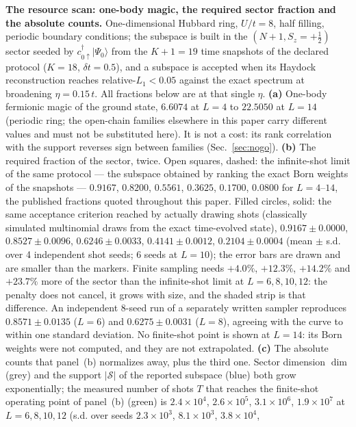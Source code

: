 \caption{\textbf{The resource scan: one-body magic, the required sector fraction and the absolute counts.}
One-dimensional Hubbard ring, $U/t=8$, half filling, periodic boundary conditions; the subspace is
built in the $(N{+}1,S_z{=}{+}\tfrac12)$ sector seeded by $c^{\dagger}_{0\uparrow}\lvert\Psi_0\rangle$ from the
$K{+}1=19$ time snapshots of the declared protocol ($K=18$, $\delta t=0.5$), and a subspace is
accepted when its Haydock reconstruction reaches relative-$L_1<0.05$ against the exact spectrum at
broadening $\eta=0.15\,t$. All fractions below are at that single $\eta$.
\textbf{(a)} One-body fermionic magic of the ground state, $6.6074$ at $L=4$ to $22.5050$ at $L=14$
(periodic ring; the open-chain families elsewhere in this paper carry different values
and must not be substituted here). It is not a cost: its rank correlation with the support reverses
sign between families (Sec.~\ref{sec:nogo}).
\textbf{(b)} The required fraction of the sector, twice. Open squares, dashed: the infinite-shot
limit of the same protocol --- the subspace obtained by ranking the exact Born weights of the
snapshots --- $0.9167$, $0.8200$, $0.5561$, $0.3625$, $0.1700$, $0.0800$ for $L=4$--$14$, the published fractions quoted throughout this paper. Filled circles, solid: the same acceptance criterion reached by
actually drawing shots (classically simulated multinomial draws from the exact time-evolved state), $0.9167\pm0.0000$, $0.8527\pm0.0096$, $0.6246\pm0.0033$, $0.4141\pm0.0012$,
$0.2104\pm0.0004$ (mean $\pm$ s.d. over 4 independent shot seeds; 6 seeds at $L=10$); the error bars
are drawn and are smaller than the markers. Finite sampling needs $+4.0\%$, $+12.3\%$, $+14.2\%$ and
$+23.7\%$ more of the sector than the infinite-shot limit at $L=6,8,10,12$: the penalty does not
cancel, it grows with size, and the shaded strip is that difference. An independent 8-seed run of a
separately written sampler reproduces $0.8571\pm0.0135$ ($L=6$) and $0.6275\pm0.0031$ ($L=8$),
agreeing with the curve to within one standard deviation. No finite-shot point is shown at $L=14$:
its Born weights were not computed, and they are not extrapolated.
\textbf{(c)} The absolute counts that panel~(b) normalizes away, plus the third one. Sector dimension
$\dim$ (grey) and the support $\lvert\mathcal{S}\rvert$ of the reported subspace (blue) both grow
exponentially; the measured number of shots $T$ that reaches the finite-shot operating point of
panel~(b) (green) is $2.4\times10^{4}$, $2.6\times10^{5}$, $3.1\times10^{6}$, $1.9\times10^{7}$ at
$L=6,8,10,12$ (s.d. over seeds $2.3\times10^{3}$, $8.1\times10^{3}$, $3.8\times10^{4}$,
}
